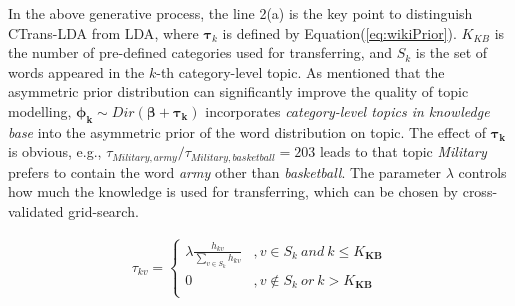 \documentclass[runningheads,a4paper]{llncs}
\theoremstyle{exampstyle}
\begin{document}
In the above generative process, the line 2(a) is the key point to distinguish CTrans-LDA from LDA\cite{blei2003latent}, where \(\bm{\tau}_k\) is defined by Equation(\ref{eq:wikiPrior}).
\(K_{KB}\) is the number of pre-defined categories used for transferring, and \(S_k\) is the set of words appeared in the \(k\)-th category-level topic.
As \cite{wallach2008structured} mentioned that the asymmetric prior distribution can significantly improve the quality of topic modelling, \(\bm{\phi_k} \sim Dir(\bm{\beta}+ \bm{\tau_k})\) incorporates \textit{category-level topics in knowledge base} into the asymmetric prior of the word distribution on topic. 
The effect of \(\bm{\tau_k}\) is obvious, e.g., \(\tau_{Military,army}/\tau_{Military,basketball}=203\) leads to that topic \textit{Military} prefers to contain the word \textit{army} other than \textit{basketball}.
The parameter \(\lambda\) controls how much the knowledge is used for transferring, which can be chosen by cross-validated grid-search. 

\setlength{\abovedisplayskip}{0pt}
\setlength{\belowdisplayskip}{0pt}
\begin{scriptsize}
\begin{equation}
\label{eq:wikiPrior}
\begin{aligned}
\tau_{kv}=
\left\{ \begin{aligned}
\lambda \frac{h_{kv}}{\sum_{v\in S_{k}}h_{kv}} &,v\in S_{k}\ and  \ k \leq K_{\bm{KB}} \\
0&,v \notin S_{k} \ or \ k > K_{\bm{KB}} \\
\end{aligned}\right.
\end{aligned}
\end{equation}
\end{scriptsize}
\end{document}
